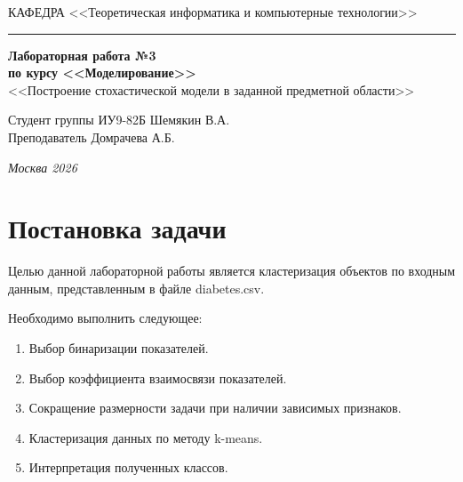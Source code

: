 \documentclass[a4paper, 14pt]{extarticle}
\begin{document}
\begin{titlepage}
\vspace{0.5ex}
\hspace{-35pt} \noindent \small КАФЕДРА\hspace{50pt} <<Теоретическая информатика и компьютерные технологии>>

\vspace*{-16pt}
\hspace{30pt}\rule{0.866\textwidth}{0.4pt}

\vspace{11em}

\begin{center}
\Large {\bf Лабораторная работа №3} \\
\large {\bf по курсу <<Моделирование>>} \\
\large <<Построение стохастической модели в заданной предметной области>>
\end{center}\normalsize

\vspace{8em}


\begin{flushright}
  {Студент группы ИУ9-82Б Шемякин В.А. \hspace*{15pt}\\
  \vspace{2ex}
  Преподаватель Домрачева А.Б.\hspace*{15pt}}
\end{flushright}

\bigskip

\vfill


\begin{center}
\textsl{Москва 2026}
\end{center}
\end{titlepage}

\setlength{\tabcolsep}{3pt}
\newpage
\setcounter{page}{2}

\section{Постановка задачи}

Целью данной лабораторной работы является кластеризация объектов по входным данным, представленным в файле diabetes.csv.

Необходимо выполнить следующее:
\begin{enumerate}[label=\arabic*.]
  \item Выбор бинаризации показателей.
  \item Выбор коэффициента взаимосвязи показателей.
  \item Сокращение размерности задачи при наличии зависимых признаков.
  \item Кластеризация данных по методу k-means.
  \item Интерпретация полученных классов.
\end{enumerate}
\end{document}
